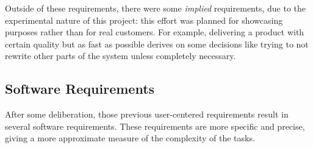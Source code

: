 Outside of these requirements, there were some \emph{implied} requirements, due to the experimental nature of this project: this effort was planned for showcasing purposes rather than for real customers.
For example, delivering a product with certain quality but as fast as possible derives on some decisions like trying to not rewrite other parts of the system unless completely necessary.


\subsection{Software Requirements} %
\label{sub:software_requirements}

After some deliberation, those previous user-centered requirements result in several software requirements.
These requirements are more specific and precise, giving a more approximate measure of the complexity of the tasks.

\begin{center}
  \begin{softwarerequirement}
    \label{tab:requirementapplet}%
  \end{softwarerequirement}
\end{center}

